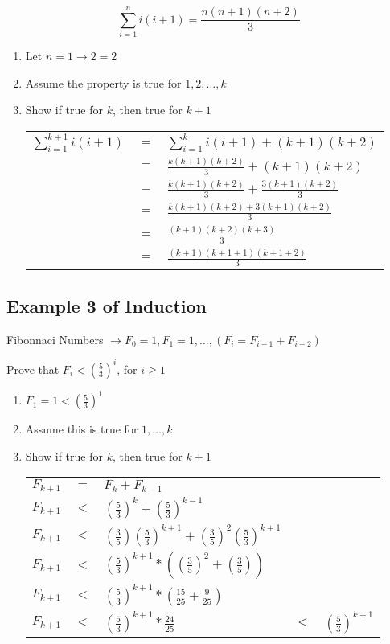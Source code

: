 \documentclass[12pt]{article}
\begin{document}
\[ \sum_{i=1}^{n} i(i+1) = \frac{n(n+1)(n+2)}{3} \]

\begin{enumerate}
    \item Let $n=1 \rightarrow 2 = 2$
    \item Assume the property is true for $1, 2, \ldots, k$
    \item Show if true for $k$, then true for $k+1$
    \\
    \begin{tabular}{l l l}
        $\sum_{i=1}^{k+1} i(i+1)$ & $=$ & $\sum_{i=1}^{k} i(i+1) + (k+1)(k+2)$ \\
        & $=$ & $\frac{k(k+1)(k+2)}{3} + (k+1)(k+2)$ \\
        & $=$ & $\frac{k(k+1)(k+2)}{3} + \frac{3(k+1)(k+2)}{3}$ \\
        & $=$ & $\frac{k(k+1)(k+2) + 3(k+1)(k+2)}{3}$ \\
        & $=$ & $\frac{(k+1)(k+2)(k+3)}{3}$ \\
        & $=$ & $\frac{(k+1)(k+1+1)(k+1+2)}{3}$ \\
    \end{tabular}

\end{enumerate}

\subsection*{Example 3 of Induction}

Fibonnaci Numbers $\rightarrow F_0 = 1, F_1 = 1, \ldots, (F_i = F_{i-1} + F_{i-2})$

Prove that $F_i < ({\frac{5}{3}})^i$, for $i \geq 1$

\begin{enumerate}

    \item $F_1 = 1 < (\frac{5}{3})^1$
    \item Assume this is true for $1, \ldots, k$
    \item Show if true for $k$, then true for $k+1$
    \\
    \begin{tabular}{l l l l l}
        $F_{k+1}$ & $=$ & $F_k + F_{k-1}$ && \\
        $F_{k+1}$ & $<$ & $(\frac{5}{3})^k + (\frac{5}{3})^{k-1}$ && \\
        $F_{k+1}$ & $<$ & $(\frac{3}{5})(\frac{5}{3})^{k+1} + (\frac{3}{5})^2(\frac{5}{3})^{k+1}$ && \\
        $F_{k+1}$ & $<$ & $(\frac{5}{3})^{k+1} * ((\frac{3}{5})^2+(\frac{3}{5}))$ && \\
        $F_{k+1}$ & $<$ & $(\frac{5}{3})^{k+1} * (\frac{15}{25} + \frac{9}{25})$ && \\
        $F_{k+1}$ & $<$ & $(\frac{5}{3})^{k+1} * \frac{24}{25}$ & $<$ & $({\frac{5}{3}})^{k+1}$ \\
    \end{tabular}

\end{enumerate}
\end{document}
